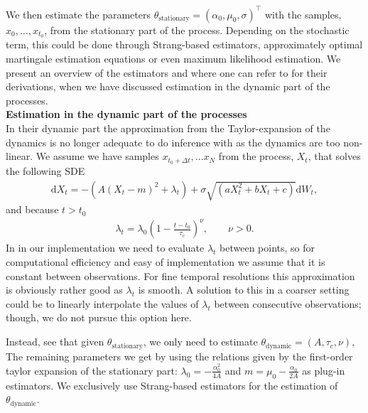 We then estimate the parameters $\theta_{\mathrm{stationary}} = (\alpha_0, \mu_0, \sigma)^\top$ with the samples, $x_{0}, \dots, x_{t_0}$, from the stationary part of the process. Depending on the stochastic term, this could be done through Strang-based estimators, approximately optimal martingale estimation equations or even maximum likelihood estimation. We present an overview of the estimators and where one can refer to for their derivations, when we have discussed estimation in the dynamic part of the processes.\\
\textbf{Estimation in the dynamic part of the processes}\\
In their dynamic part the approximation from the Taylor-expansion of the dynamics is no longer adequate to do inference with as the dynamics are too non-linear. We assume we have samples $x_{t_0+\Delta t}, \dots x_{N}$ from the process, $X_t$, that solves the following SDE
\begin{align}
    \mathrm{d}X_t = -\left(A(X_t - m)^2 + \lambda_t\right) + \sigma\sqrt{\left(aX_t^2 + bX_t + c\right)}\mathrm{d}W_t, 
\end{align}
and because $t>t_0$
\begin{align}
    \lambda_t = \lambda_0\left(1 - \frac{t - t_0}{\tau_c}\right)^\nu, \qquad \nu >0.
\end{align} 
In in our implementation we need to evaluate $\lambda_t$ between points, so for computational efficiency and easy of implementation we assume that it is constant between observations. For fine temporal resolutions this approximation is obviously rather good as $\lambda_t$ is smooth. A solution to this in a coarser setting could be to linearly interpolate the values of $\lambda_t$ between consecutive observations; though, we do not pursue this option here. 

Instead, see that given $\theta_{\mathrm{stationary}}$, we only need to estimate $\theta_{\mathrm{dynamic}} = (A, \tau_c, \nu)$, The remaining parameters we get by using the relations given by the first-order taylor expansion of the stationary part: $\lambda_0 = -\frac{\alpha_0^2}{4A}$ and $m = \mu_0 - \frac{\alpha_0}{2A}$ as plug-in estimators. We exclusively use Strang-based estimators for the estimation of $\theta_{\mathrm{dynamic}}$. 
